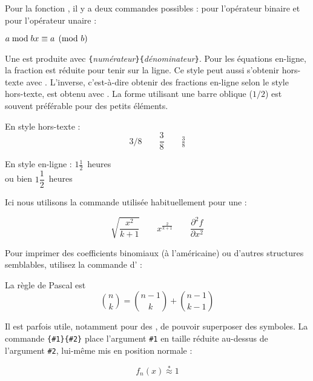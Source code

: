 Pour la fonction , il y a deux commandes possibles :
 pour l'opérateur binaire et
 pour l'opérateur unaire :
\begin{example}
$a\bmod b \\
 x\equiv a \pmod{b}$
\end{example}

Une \textbf{} est produite avec
\verb|{|\emph{numérateur}\verb|}{|\emph{dénominateur}\verb|}|. Pour
les équations en-ligne, la fraction est réduite pour tenir sur la
ligne. Ce style peut aussi s'obtenir hors-texte avec
. L'inverse, c'est-à-dire obtenir des fractions en-ligne
selon le style hors-texte, est obtenu avec .  La forme
utilisant une barre oblique ($1/2$) est souvent préférable pour des
petits éléments.
\begin{example}
En style hors-texte :
\begin{equation*}
  3/8 \qquad \frac{3}{8}
  \qquad \tfrac{3}{8}
\end{equation*}
\end{example}

\begin{example}
En style en-ligne :
$1\frac{1}{2}$~heures \\
ou bien $1\dfrac{1}{2}$~heures
\end{example}

Ici nous utilisons la commande  utilisée habituellement
pour une  :
\begin{example}
\begin{equation*}
  \sqrt{\frac{x^2}{k+1}}\qquad
  x^\frac{2}{k+1}\qquad
  \frac{\partial^2f}
  {\partial x^2}
\end{equation*}
\end{example}

Pour imprimer des coefficients binomiaux (à l'américaine) ou d'autres
structures semblables, utilisez la commande  d' :
\begin{example}
La règle de Pascal est
\begin{equation*}
 \binom{n}{k} =\binom{n-1}{k}
 + \binom{n-1}{k-1}
\end{equation*}
\end{example}

Il est parfois utile, notamment pour des , de
pouvoir superposer des symboles.  La commande
\verb|{#1}{#2}| place l'argument \verb|#1| en taille
réduite au-dessus de l'argument \verb|#2|, lui-même mis en position
normale :
\begin{example}
\begin{equation*}
 f_n(x) \stackrel{*}{\approx} 1
\end{equation*}
\end{example}

